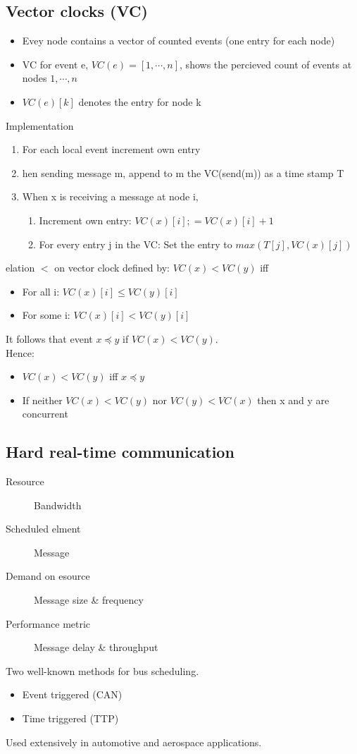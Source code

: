 \documentclass[course, english]{Notes}
\begin{document}
\subsection{Vector clocks (VC)}
\begin{itemize}
	\item Evey node contains a vector of counted events (one entry for each
		node)
	\item VC for event e, $VC(e)=[1,\cdots,n]$, shows the percieved count of
		events at nodes $1,\cdots,n$
	\item $VC(e)[k]$ denotes the entry for node k
\end{itemize}
Implementation
\begin{enumerate}
	\item For each local event increment own entry
	\item hen sending message m, append to m the VC(send(m)) as a time stamp
		T
	\item When x is receiving a message at node i,
		\begin{enumerate}
			\item Increment own entry: $VC(x)[i];=VC(x)[i]+1$
			\item For every entry j in the VC: Set the entry to
				$max(T[j],VC(x)[j])$
		\end{enumerate}
\end{enumerate}
elation $<$ on vector clock defined by: $VC(x) < VC(y)$ iff
\begin{itemize}
	\item For all i: $VC(x)[i] \leq VC(y)[i]$
	\item For some i: $VC(x)[i]<VC(y)[i]$
\end{itemize}
It follows that event $x \preccurlyeq y$ if $VC(x) < VC(y)$. \\
Hence:
\begin{itemize}
	\item $VC(x) < VC(y)$ iff $x \preccurlyeq y$
	\item If neither $VC(x) < VC(y)$ nor $VC(y) < VC(x)$ then x and y are
		concurrent
\end{itemize}
\subsection{Hard real-time communication}
\begin{description}
	\item[Resource] Bandwidth
	\item[Scheduled elment] Message
	\item[Demand on esource] Message size \& frequency
	\item[Performance metric] Message delay \& throughput
\end{description}
Two well-known methods for bus scheduling.
\begin{itemize}
	\item Event triggered (CAN)
	\item Time triggered (TTP)
\end{itemize}
Used extensively in automotive and aerospace applications.
\end{document}
